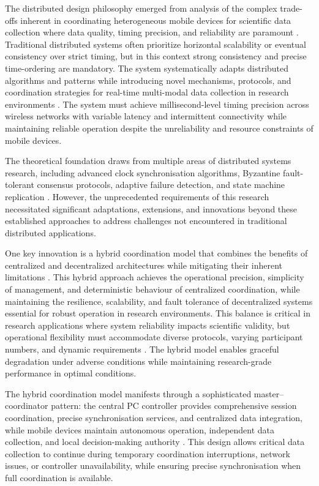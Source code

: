 \documentclass[11pt,a4paper]{report}
\begin{document}
The distributed design philosophy emerged from analysis of the complex trade-offs inherent in coordinating heterogeneous mobile devices for scientific data collection where data quality, timing precision, and reliability are paramount \cite{Fischer1985}. Traditional distributed systems often prioritize horizontal scalability or eventual consistency over strict timing, but in this context strong consistency and precise time-ordering are mandatory. The system systematically adapts distributed algorithms and patterns while introducing novel mechanisms, protocols, and coordination strategies for real-time multi-modal data collection in research environments \cite{Birman2005}. The system must achieve millisecond-level timing precision across wireless networks with variable latency and intermittent connectivity while maintaining reliable operation despite the unreliability and resource constraints of mobile devices.

The theoretical foundation draws from multiple areas of distributed systems research, including advanced clock synchronisation algorithms, Byzantine fault-tolerant consensus protocols, adaptive failure detection, and state machine replication \cite{Schneider1990}. However, the unprecedented requirements of this research necessitated significant adaptations, extensions, and innovations beyond these established approaches to address challenges not encountered in traditional distributed applications.

One key innovation is a hybrid coordination model that combines the benefits of centralized and decentralized architectures while mitigating their inherent limitations \cite{Mullender1993}. This hybrid approach achieves the operational precision, simplicity of management, and deterministic behaviour of centralized coordination, while maintaining the resilience, scalability, and fault tolerance of decentralized systems essential for robust operation in research environments. This balance is critical in research applications where system reliability impacts scientific validity, but operational flexibility must accommodate diverse protocols, varying participant numbers, and dynamic requirements \cite{Chandra1996}. The hybrid model enables graceful degradation under adverse conditions while maintaining research-grade performance in optimal conditions.

The hybrid coordination model manifests through a sophisticated master--coordinator pattern: the central PC controller provides comprehensive session coordination, precise synchronisation services, and centralized data integration, while mobile devices maintain autonomous operation, independent data collection, and local decision-making authority \cite{Lamport2001}. This design allows critical data collection to continue during temporary coordination interruptions, network issues, or controller unavailability, while ensuring precise synchronisation when full coordination is available.
\end{document}

